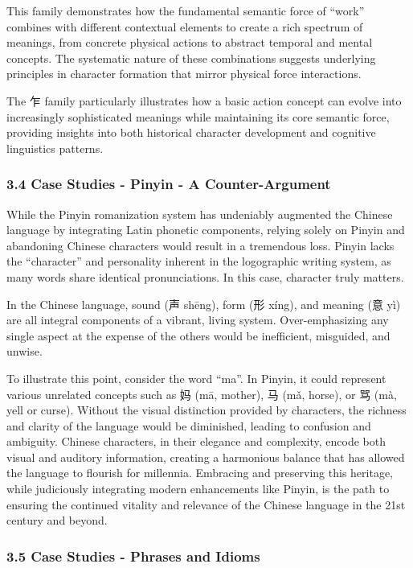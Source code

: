 \documentclass[
  11pt,
  letterpaper,
]{article}
\begin{document}
This family demonstrates how the fundamental semantic force of ``work''
combines with different contextual elements to create a rich spectrum of
meanings, from concrete physical actions to abstract temporal and mental
concepts. The systematic nature of these combinations suggests
underlying principles in character formation that mirror physical force
interactions.

The 乍 family particularly illustrates how a basic action concept can
evolve into increasingly sophisticated meanings while maintaining its
core semantic force, providing insights into both historical character
development and cognitive linguistics patterns.

\hypertarget{case-studies---pinyin---a-counter-argument}{%
\subsubsection{3.4 Case Studies - Pinyin - A
Counter-Argument}\label{case-studies---pinyin---a-counter-argument}}

While the Pinyin romanization system has undeniably augmented the
Chinese language by integrating Latin phonetic components, relying
solely on Pinyin and abandoning Chinese characters would result in a
tremendous loss. Pinyin lacks the ``character'' and personality inherent
in the logographic writing system, as many words share identical
pronunciations. In this case, character truly matters.

In the Chinese language, sound (声 shēng), form (形 xíng), and meaning
(意 yì) are all integral components of a vibrant, living system.
Over-emphasizing any single aspect at the expense of the others would be
inefficient, misguided, and unwise.

To illustrate this point, consider the word ``ma''. In Pinyin, it could
represent various unrelated concepts such as 妈 (mā, mother), 马 (mǎ,
horse), or 骂 (mà, yell or curse). Without the visual distinction
provided by characters, the richness and clarity of the language would
be diminished, leading to confusion and ambiguity. Chinese characters,
in their elegance and complexity, encode both visual and auditory
information, creating a harmonious balance that has allowed the language
to flourish for millennia. Embracing and preserving this heritage, while
judiciously integrating modern enhancements like Pinyin, is the path to
ensuring the continued vitality and relevance of the Chinese language in
the 21st century and beyond.

\hypertarget{case-studies---phrases-and-idioms}{%
\subsubsection{3.5 Case Studies - Phrases and
Idioms}\label{case-studies---phrases-and-idioms}}
\end{document}
